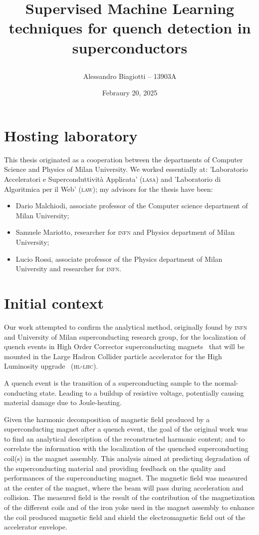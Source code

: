 \documentclass[a4paper, notitlepage]{article}
\title{
	\textsf{Supervised Machine Learning techniques for quench detection in superconductors} \\
	\author{Alessandro Biagiotti -- 13903A}
        \date{Febraury 20, 2025}
}
\begin{document}
\maketitle
\section{Hosting laboratory}
This thesis originated as a cooperation between the departments of Computer Science and Physics of
Milan University. We worked essentially at: 'Laboratorio Acceleratori e Superconduttività Applicata'
(\textsc{lasa}) and 'Laboratorio di Algoritmica per il Web' (\textsc{law}); my advisors for the
thesis have been:
\begin{itemize}
	\item Dario Malchiodi, associate professor of the Computer science department of Milan University;
	\item Samuele Mariotto, researcher for \textsc{infn} and Physics department of Milan
	      University;
	\item Lucio Rossi, associate professor of the Physics department of Milan University and
	      researcher for \textsc{infn}.
\end{itemize}
\section{Initial context}
Our work attempted to confirm the analytical method, originally found by \textsc{infn} and
University of Milan superconducting research group, for the localization of quench events in High
Order Corrector superconducting magnets~\cite{mariotto2022-hoc, mariotto2022-generic} that will be
mounted in the Large Hadron Collider particle accelerator for the High Luminosity upgrade~\cite{rossi2024-hllhc} (\textsc{hl-lhc}).

A quench event is the transition of a superconducting sample to the normal-conducting state.
Leading to a buildup of resistive voltage, potentially causing material damage due to Joule-heating.

Given the harmonic decomposition of magnetic field produced by a superconducting magnet after a quench event, the goal of the original
work was to find an analytical description of the reconstructed harmonic content; and to correlate
the information with the localization of the quenched superconducting coil(s) in the magnet
assembly. This analysis aimed at predicting degradation of the superconducting material and
providing feedback on the quality and performances of the superconducting magnet. The magnetic field
was measured at the center of the magnet, where the beam will pass during acceleration and
collision. The measured field is the result of the contribution of the magnetization of the
different coils and of the iron yoke used in the magnet assembly to enhance the coil produced
magnetic field and shield the electromagnetic field out of the accelerator envelope.
\end{document}
